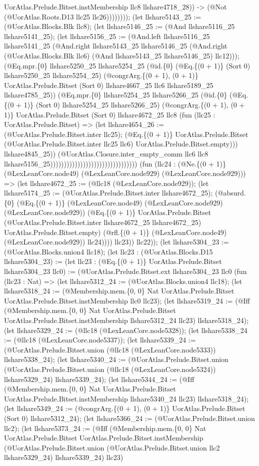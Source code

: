 \documentclass[11pt]{article}
\begin{document}
UorAtlas.Prelude.Bitset.instMembership llc8 llshare4718\_28)) -> (@Not (@UorAtlas.Roots.D13 llc25 llc26)))))))); (let llshare5143\_25 := (@UorAtlas.Blocks.Blk llc8); (let llshare5146\_25 := (@And llshare5116\_25 llshare5141\_25); (let llshare5156\_25 := (@And.left llshare5116\_25 llshare5141\_25 (@And.right llshare5143\_25 llshare5146\_25 (@And.right (@UorAtlas.Blocks.Blk llc6) (@And llshare5143\_25 llshare5146\_25) llc12))); (@Eq.mpr.\{0\} llshare5250\_25 llshare5254\_25 (@id.\{0\} (@Eq.\{(0 + 1)\} (Sort 0) llshare5250\_25 llshare5254\_25) (@congrArg.\{(0 + 1), (0 + 1)\} UorAtlas.Prelude.Bitset (Sort 0) llshare4667\_25 llc6 llshare5189\_25 llshare4785\_25)) (@Eq.mpr.\{0\} llshare5254\_25 llshare5266\_25 (@id.\{0\} (@Eq.\{(0 + 1)\} (Sort 0) llshare5254\_25 llshare5266\_25) (@congrArg.\{(0 + 1), (0 + 1)\} UorAtlas.Prelude.Bitset (Sort 0) llshare4672\_25 llc8 (fun (llc25 : UorAtlas.Prelude.Bitset) => (let llshare4654\_26 := (@UorAtlas.Prelude.Bitset.inter llc25); (@Eq.\{(0 + 1)\} UorAtlas.Prelude.Bitset (@UorAtlas.Prelude.Bitset.inter llc25 llc6) UorAtlas.Prelude.Bitset.empty))) llshare4845\_25)) (@UorAtlas.Closure.inter\_empty\_comm llc6 llc8 llshare5156\_25)))))))))))))))))))))))))))))))) (fun (llc24 : (@Ne.\{(0 + 1)\} (@LexLeanCore.node49) (@LexLeanCore.node929) (@LexLeanCore.node929))) => (let llshare4672\_25 := (@llc18 (@LexLeanCore.node929)); (let llshare5174\_25 := (@UorAtlas.Prelude.Bitset.inter llshare4672\_25); (@absurd.\{0\} (@Eq.\{(0 + 1)\} (@LexLeanCore.node49) (@LexLeanCore.node929) (@LexLeanCore.node929)) (@Eq.\{(0 + 1)\} UorAtlas.Prelude.Bitset (@UorAtlas.Prelude.Bitset.inter llshare4672\_25 llshare4672\_25) UorAtlas.Prelude.Bitset.empty) (@rfl.\{(0 + 1)\} (@LexLeanCore.node49) (@LexLeanCore.node929)) llc24)))) llc23)) llc22)); (let llshare5304\_23 := (@UorAtlas.Blocks.union4 llc18); (let llc23 : (@UorAtlas.Blocks.D15 llshare5304\_23) := (let llc23 : (@Eq.\{(0 + 1)\} UorAtlas.Prelude.Bitset llshare5304\_23 llc0) := (@UorAtlas.Prelude.Bitset.ext llshare5304\_23 llc0 (fun (llc23 : Nat) => (let llshare5312\_24 := (@UorAtlas.Blocks.union4 llc18); (let llshare5318\_24 := (@Membership.mem.\{0, 0\} Nat UorAtlas.Prelude.Bitset UorAtlas.Prelude.Bitset.instMembership llc0 llc23); (let llshare5319\_24 := (@Iff (@Membership.mem.\{0, 0\} Nat UorAtlas.Prelude.Bitset UorAtlas.Prelude.Bitset.instMembership llshare5312\_24 llc23) llshare5318\_24); (let llshare5329\_24 := (@llc18 (@LexLeanCore.node5328)); (let llshare5338\_24 := (@llc18 (@LexLeanCore.node5337)); (let llshare5339\_24 := (@UorAtlas.Prelude.Bitset.union (@llc18 (@LexLeanCore.node5333)) llshare5338\_24); (let llshare5340\_24 := (@UorAtlas.Prelude.Bitset.union (@UorAtlas.Prelude.Bitset.union (@llc18 (@LexLeanCore.node5324)) llshare5329\_24) llshare5339\_24); (let llshare5344\_24 := (@Iff (@Membership.mem.\{0, 0\} Nat UorAtlas.Prelude.Bitset UorAtlas.Prelude.Bitset.instMembership llshare5340\_24 llc23) llshare5318\_24); (let llshare5349\_24 := (@congrArg.\{(0 + 1), (0 + 1)\} UorAtlas.Prelude.Bitset (Sort 0) llshare5312\_24); (let llshare5366\_24 := (@UorAtlas.Prelude.Bitset.union llc2); (let llshare5373\_24 := (@Iff (@Membership.mem.\{0, 0\} Nat UorAtlas.Prelude.Bitset UorAtlas.Prelude.Bitset.instMembership (@UorAtlas.Prelude.Bitset.union (@UorAtlas.Prelude.Bitset.union llc2 llshare5329\_24) llshare5339\_24) llc23) 
\end{document}
